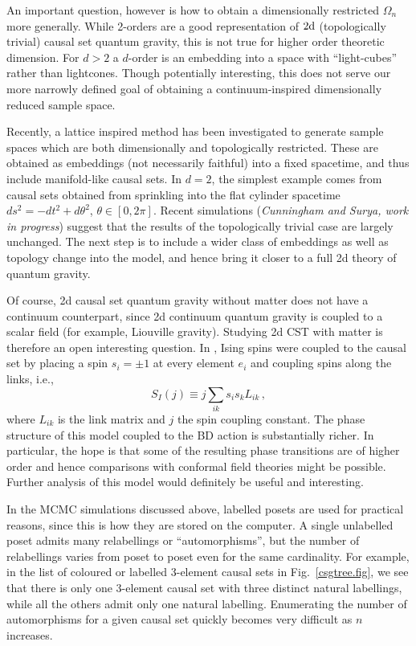 An important question, however is how to obtain a dimensionally restricted $\Omega_n$ more generally. While  2-orders
are a good representation of $\mathrm{2d}$ (topologically trivial) causal set quantum gravity,  this is not true for
 higher order theoretic dimension.   For $d>2$ a   $d$-order is an embedding into a space with ``light-cubes'' rather
 than lightcones. Though potentially interesting, this does not serve our more narrowly defined goal of obtaining a
 continuum-inspired dimensionally reduced sample space.

 Recently,  a   lattice inspired method  has been
 investigated to generate sample spaces which are both dimensionally and topologically restricted. These are obtained as
 embeddings (not necessarily faithful) into a fixed spacetime, and thus include manifold-like causal sets. In
$d=2$, the simplest example comes from causal sets obtained from sprinkling into the flat cylinder spacetime
$ds^2= - dt^2+d\theta^2$, $\theta \in [0,2\pi]$.  Recent  simulations ({\it Cunningham and Surya, work in progress}) suggest that the results of
the topologically trivial case are largely unchanged. The next step is to include a wider class of embeddings as well as
topology change into the model, and hence bring it closer to a full 2d theory of quantum gravity.  

Of course, 2d causal set quantum gravity without matter does not have a continuum counterpart, since 2d continuum quantum gravity 
is coupled to a
scalar field (for example,   Liouville gravity).  Studying 2d CST with matter is therefore an open interesting question.  In \cite{ising}, Ising
spins were coupled to the causal set by placing a spin $s_i=\pm 1 $ at every element $e_i$ and coupling spins along the links, i.e.,
\begin{equation}
S_{I}(j)\equiv j \sum_{i k} s_i s_k L_{ik} \,,
  \end{equation}  
where $L_{ik}$ is the link matrix and $j$ the spin coupling constant.  The phase structure of this model coupled to the
BD action is substantially richer. In particular, the hope is that some of the resulting phase transitions are of higher
order and hence comparisons with conformal field theories might be possible. Further analysis of this model would
definitely be useful and interesting. 

In the MCMC simulations discussed above,  labelled posets are used for practical reasons, since this is how they are stored on the computer. A single  unlabelled poset admits many relabellings  or ``automorphisms'', but the 
number of relabellings varies from poset to poset even  for the same cardinality.
{For example, in the list of coloured or labelled 3-element causal sets in } 
Fig.~\ref{csgtree.fig}, we see that there is only one  3-element causal set with
three distinct natural labellings, while 
all {the} others admit only one {natural labelling}. Enumerating the
number of automorphisms {for a given causal set} quickly becomes {very difficult}  as $n$ increases.

